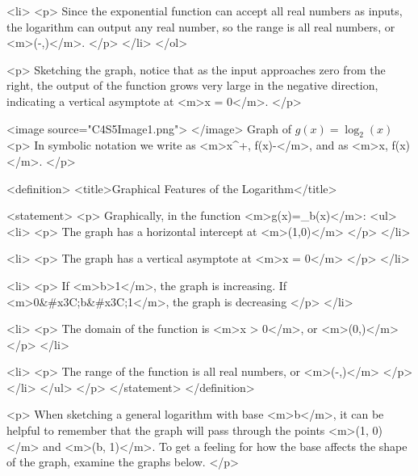             <li>
                <p>
                    Since the exponential function can accept all real numbers as inputs, the logarithm can output any real number, so the range is all real numbers, or <m>(-\infty,\infty)</m>.
                </p>
            </li>
        </ol>

        <p>
            Sketching the graph, notice that as the input approaches zero from the right, the output of the function grows very large in the negative direction, indicating a vertical asymptote at <m>x = 0</m>.
        </p>

        <image source="C4S5Image1.png">
        </image>
        Graph of $g(x)=\log_{2}(x)$
        <p>
            In symbolic notation we write as <m>x^{+}, f(x)\to -\infty</m>, and as <m>x\to \infty, f(x)\to \infty</m>.
        </p>

        <definition>
            <title>Graphical Features of the Logarithm</title>

            <statement>
                <p>
                    Graphically, in the function <m>g(x)=\log_{b}(x)</m>:
                    <ul>
                        <li>
                            <p>
                                The graph has a horizontal intercept at <m>(1,0)</m>
                            </p>
                        </li>

                        <li>
                            <p>
                                The graph has a vertical asymptote at <m>x = 0</m>
                            </p>
                        </li>

                        <li>
                            <p>
                                If <m>b>1</m>, the graph is increasing.
                                If <m>0&#x3C;b&#x3C;1</m>, the graph is decreasing
                            </p>
                        </li>

                        <li>
                            <p>
                                The domain of the function is <m>x > 0</m>, or <m>(0,\infty)</m>
                            </p>
                        </li>

                        <li>
                            <p>
                                The range of the function is all real numbers, or <m>(-\infty,\infty)</m>
                            </p>
                        </li>
                    </ul>
                </p>
            </statement>
        </definition>

        <p>
            When sketching a general logarithm with base <m>b</m>, it can be helpful to remember that the graph will pass through the points <m>(1, 0)</m> and <m>(b, 1)</m>.
            To get a feeling for how the base affects the shape of the graph, examine the graphs below.
        </p>

